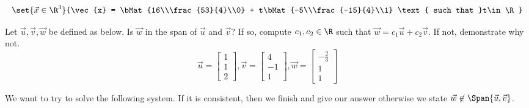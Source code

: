 \documentclass[12pt,addpoints,answers]{exam}
\begin{document}
\begin{questions}
\begin{solution}
            \[
                \set{\vec{x}\in\R^{3}}{\vec{x} = \bMat{16\\\frac{53}{4}\\0} + t\bMat{-5\\\frac{-15}{4}\\1}
                \text{ such that }t\in\R}
            \]
        \end{solution}
        \vfill
        \newpage
        \question[15] Let $\vec{u},\vec{v},\vec{w}$ be defined as below. Is $\vec{w}$ in the span of
        $\vec{u}$ and $\vec{v}$? If so, compute $c_1,c_2\in\R$ such that $\vec{w} = c_1\vec{u} + c_2\vec{v}$. If not,
        demonstrate why not.
        \[
            \vec{u} = \begin{bmatrix} 1 \\ 1 \\ 2 \end{bmatrix}, \vec{v} = \begin{bmatrix} 4 \\ -1 \\ 1\end{bmatrix},
                \vec{w} = \begin{bmatrix} -\frac{2}{3} \\ 1 \\ 1\end{bmatrix}
        \]
        \begin{solution}
            We want to try to solve the following system. If it is consistent, then we finish and
            give our answer otherwise we state $\vec{w}\not\in\Span{\vec{u},\vec{v}}$.


\end{solution}
\end{questions}
\end{document}
